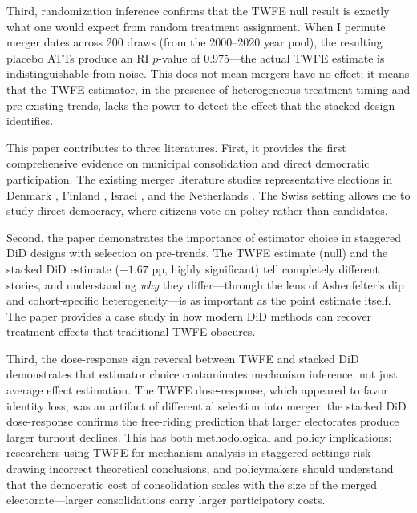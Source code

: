 \documentclass[12pt]{article}
\begin{document}
Third, randomization inference confirms that the TWFE null result is exactly what one would expect from random treatment assignment. When I permute merger dates across 200 draws (from the 2000--2020 year pool), the resulting placebo ATTs produce an RI $p$-value of 0.975---the actual TWFE estimate is indistinguishable from noise. This does not mean mergers have no effect; it means that the TWFE estimator, in the presence of heterogeneous treatment timing and pre-existing trends, lacks the power to detect the effect that the stacked design identifies.

This paper contributes to three literatures. First, it provides the first comprehensive evidence on municipal consolidation and direct democratic participation. The existing merger literature studies representative elections in Denmark \citep{lassen2011institutional, blomhansen2016municipal}, Finland \citep{harjunen2021political, saarimaa2015political2}, Israel \citep{reingewertz2012political}, and the Netherlands \citep{allers2015effects}. The Swiss setting allows me to study direct democracy, where citizens vote on policy rather than candidates.

Second, the paper demonstrates the importance of estimator choice in staggered DiD designs with selection on pre-trends. The TWFE estimate (null) and the stacked DiD estimate ($-1.67$ pp, highly significant) tell completely different stories, and understanding \textit{why} they differ---through the lens of Ashenfelter's dip and cohort-specific heterogeneity---is as important as the point estimate itself. The paper provides a case study in how modern DiD methods \citep{callaway2021difference, baker2022staggered, goodmanbacon2021difference, borusyak2024revisiting, dechaisemartin2020two} can recover treatment effects that traditional TWFE obscures.

Third, the dose-response sign reversal between TWFE and stacked DiD demonstrates that estimator choice contaminates mechanism inference, not just average effect estimation. The TWFE dose-response, which appeared to favor identity loss, was an artifact of differential selection into merger; the stacked DiD dose-response confirms the free-riding prediction that larger electorates produce larger turnout declines. This has both methodological and policy implications: researchers using TWFE for mechanism analysis in staggered settings risk drawing incorrect theoretical conclusions, and policymakers should understand that the democratic cost of consolidation scales with the size of the merged electorate---larger consolidations carry larger participatory costs.
\end{document}
